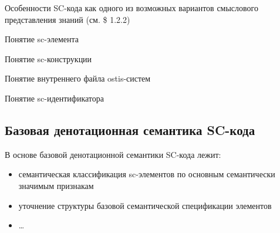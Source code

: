 Особенности SC-кода как одного из возможных
вариантов смыслового представления знаний 
(см. \$ 1.2.2) 

Понятие sc-элемента 

Понятие sc-конструкции 

Понятие внутреннего файла ostis-систем 

Понятие sc-идентификатора

\begin{SCn}
\section{Базовая денотационная семантика SC-кода}
\label{sec_sr_scdsemantics}
В основе базовой денотационной семантики
SC-кода лежит:
\begin{itemize} 
\item семантическая классификация sc-элементов по
основным семантически значимым признакам 
\item уточнение структуры базовой семантической
спецификации элементов
\item …
\end{itemize}

\scnstartstruct


\end{SCn}
